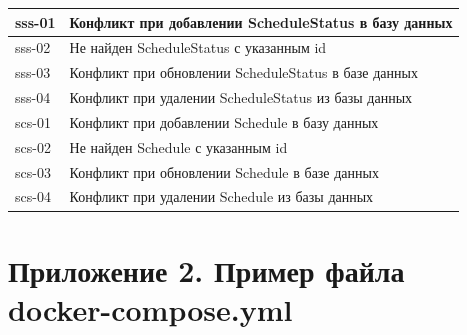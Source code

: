 \documentclass[a4paper,article]{article}
\begin{document}
\begin{sloppypar}
\begin{appendices}
\begin{xltabular}{\textwidth} { |
                >{\hsize} X |
                >{\hsize} X | }
            \hline
            sss-01
            & Конфликт при добавлении ScheduleStatus в базу данных \\
            
            \hline
            sss-02
            & Не найден ScheduleStatus с указанным id \\
            
            \hline
            sss-03
            & Конфликт при обновлении ScheduleStatus в базе данных \\
            
            \hline
            sss-04
            & Конфликт при удалении ScheduleStatus из базы данных \\
            
            \hline
            scs-01
            & Конфликт при добавлении Schedule в базу данных \\
            
            \hline
            scs-02
            & Не найден Schedule с указанным id \\
            
            \hline
            scs-03
            & Конфликт при обновлении Schedule в базе данных \\
            
            \hline
            scs-04
            & Конфликт при удалении Schedule из базы данных \\
            
            \hline
        \end{xltabular}
        
        \newpage
        
        \section*{Приложение 2. Пример файла docker-compose.yml}\label{dockercomposeyml}
        \setcounter{section}{2}
        

\end{appendices}
\end{sloppypar}
\end{document}
